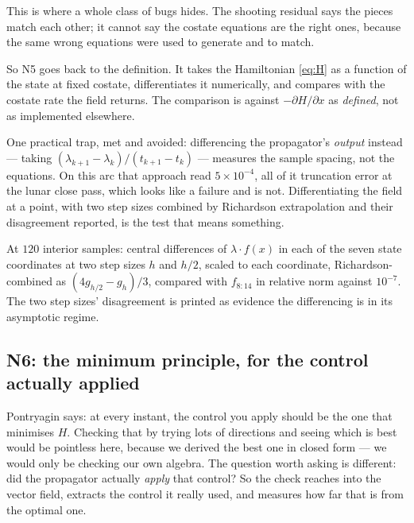 \documentclass[11pt]{article}
\begin{document}
\begin{intu}
This is where a whole class of bugs hides. The shooting residual says the
pieces match each other; it cannot say the costate equations are the right
ones, because the same wrong equations were used to generate and to match.

So N5 goes back to the definition. It takes the Hamiltonian
\eqref{eq:H} as a function of the state at fixed costate, differentiates it
numerically, and compares with the costate rate the field returns. The
comparison is against $-\partial H/\partial x$ as \emph{defined}, not as
implemented elsewhere.

One practical trap, met and avoided: differencing the propagator's \emph{output}
instead --- taking $(\lambda_{k+1} - \lambda_k)/(t_{k+1} - t_k)$ --- measures the
sample spacing, not the equations. On this arc that approach read
$5\times10^{-4}$, all of it truncation error at the lunar close pass, which
looks like a failure and is not. Differentiating the field at a point, with two
step sizes combined by Richardson extrapolation and their disagreement
reported, is the test that means something.
\end{intu}

\begin{rig}
At $120$ interior samples: central differences of
$\lambda \cdot f(x)$ in each of the seven state coordinates at two step sizes
$h$ and $h/2$, scaled to each coordinate, Richardson-combined as
$(4g_{h/2} - g_h)/3$, compared with $f_{8:14}$ in relative norm against
$10^{-7}$. The two step sizes' disagreement is printed as evidence the
differencing is in its asymptotic regime.
\end{rig}

\subsection{N6: the minimum principle, for the control actually applied}\label{sec:N6}

\begin{eli}
Pontryagin says: at every instant, the control you apply should be the one that
minimises $H$. Checking that by trying lots of directions and seeing which is
best would be pointless here, because we derived the best one in closed form ---
we would only be checking our own algebra. The question worth asking is
different: did the propagator actually \emph{apply} that control? So the check
reaches into the vector field, extracts the control it really used, and measures
how far that is from the optimal one.
\end{eli}
\end{document}
